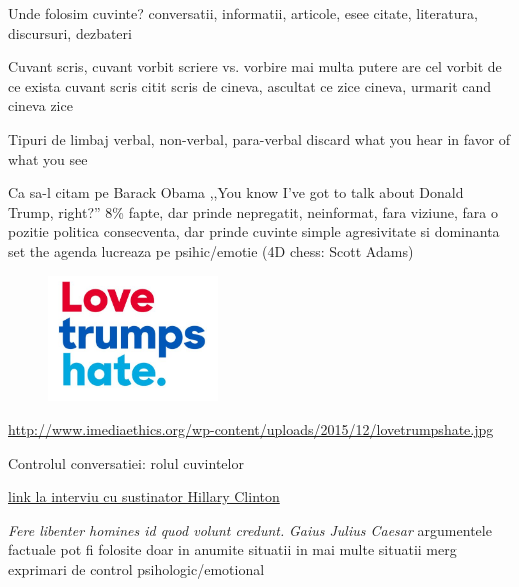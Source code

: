 \documentclass{beamer}
\begin{document}
\begin{frame}{Unde folosim cuvinte?}
  conversatii, informatii, articole, esee
  citate, literatura, discursuri, dezbateri
\end{frame}

\begin{frame}{Cuvant scris, cuvant vorbit}
  scriere vs. vorbire
  mai multa putere are cel vorbit
  de ce exista cuvant scris
  citit scris de cineva, ascultat ce zice cineva, urmarit cand cineva zice
\end{frame}

\begin{frame}{Tipuri de limbaj}
  verbal, non-verbal, para-verbal
  discard what you hear in favor of what you see
\end{frame}

\begin{frame}{Ca sa-l citam pe Barack Obama}
  ,,You know I've got to talk about Donald Trump, right?''
  8\% fapte, dar prinde
  nepregatit, neinformat, fara viziune, fara o pozitie politica consecventa, dar prinde
  cuvinte simple
  agresivitate si dominanta
  set the agenda
  lucreaza pe psihic/emotie (4D chess: Scott Adams)
  \begin{figure}
    \centering
    \includegraphics[width=0.4\textwidth]{img/love-trumps-hate}
  \end{figure}
  \begin{center}
    \tiny
    \url{http://www.imediaethics.org/wp-content/uploads/2015/12/lovetrumpshate.jpg}
  \end{center}
\end{frame}

\begin{frame}{Controlul conversatiei: rolul cuvintelor}
  \begin{center}
    \scriptsize
    \url{link la interviu cu sustinator Hillary Clinton}
  \end{center}
  \centering
  \textit{Fere libenter homines id quod volunt credunt.}
  \vspace{3mm}
  \hfill \textit{Gaius Julius Caesar}
  argumentele factuale pot fi folosite doar in anumite situatii
  in mai multe situatii merg exprimari de control psihologic/emotional
\end{frame}
\end{document}
